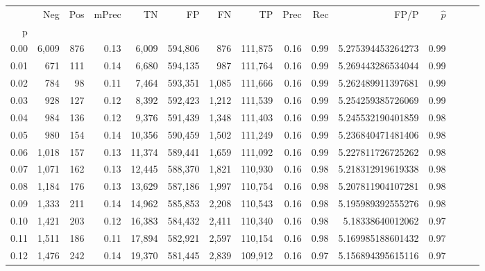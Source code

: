 \begin{tabular}{rrrrrrrrrrrrrrr}
\toprule
{} &     Neg &    Pos & mPrec &       TN &       FP &       FN &       TP &  Prec &   Rec &                  FP/P & $\hat{p}$ \\
p    &         &        &       &          &          &          &          &       &       &                       &           \\
\midrule
0.00 &   6,009 &    876 &  0.13 &    6,009 &  594,806 &      876 &  111,875 &  0.16 &  0.99 &     5.275394453264273 &      0.99 \\
0.01 &     671 &    111 &  0.14 &    6,680 &  594,135 &      987 &  111,764 &  0.16 &  0.99 &     5.269443286534044 &      0.99 \\
0.02 &     784 &     98 &  0.11 &    7,464 &  593,351 &    1,085 &  111,666 &  0.16 &  0.99 &     5.262489911397681 &      0.99 \\
0.03 &     928 &    127 &  0.12 &    8,392 &  592,423 &    1,212 &  111,539 &  0.16 &  0.99 &     5.254259385726069 &      0.99 \\
0.04 &     984 &    136 &  0.12 &    9,376 &  591,439 &    1,348 &  111,403 &  0.16 &  0.99 &     5.245532190401859 &      0.98 \\
0.05 &     980 &    154 &  0.14 &   10,356 &  590,459 &    1,502 &  111,249 &  0.16 &  0.99 &     5.236840471481406 &      0.98 \\
0.06 &   1,018 &    157 &  0.13 &   11,374 &  589,441 &    1,659 &  111,092 &  0.16 &  0.99 &     5.227811726725262 &      0.98 \\
0.07 &   1,071 &    162 &  0.13 &   12,445 &  588,370 &    1,821 &  110,930 &  0.16 &  0.98 &     5.218312919619338 &      0.98 \\
0.08 &   1,184 &    176 &  0.13 &   13,629 &  587,186 &    1,997 &  110,754 &  0.16 &  0.98 &     5.207811904107281 &      0.98 \\
0.09 &   1,333 &    211 &  0.14 &   14,962 &  585,853 &    2,208 &  110,543 &  0.16 &  0.98 &     5.195989392555276 &      0.98 \\
0.10 &   1,421 &    203 &  0.12 &   16,383 &  584,432 &    2,411 &  110,340 &  0.16 &  0.98 &      5.18338640012062 &      0.97 \\
0.11 &   1,511 &    186 &  0.11 &   17,894 &  582,921 &    2,597 &  110,154 &  0.16 &  0.98 &     5.169985188601432 &      0.97 \\
0.12 &   1,476 &    242 &  0.14 &   19,370 &  581,445 &    2,839 &  109,912 &  0.16 &  0.97 &     5.156894395615116 &      0.97 \\

\end{tabular}
